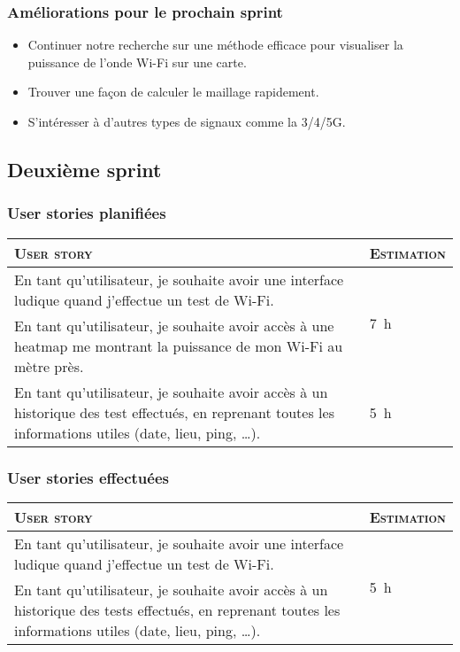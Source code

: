 \documentclass{elsarticle}
\newcommand{\est}[1]{\multirow{2}{*}{\SI{#1}{\hour}}}
\begin{document}
\subsubsection{Améliorations pour le prochain sprint}
\begin{itemize}
	\item Continuer notre recherche sur une méthode efficace pour visualiser la puissance de l’onde Wi-Fi sur une carte.
	\item Trouver une façon de calculer le maillage rapidement.
	\item S’intéresser à d’autres types de signaux comme la 3/4/5G.
\end{itemize}

\subsection{Deuxième sprint}
\subsubsection{User stories planifiées}
\begin{table}[H]
	\centering
	\begin{tabular}{p{14cm}m{2cm}}
		\toprule
		\textsc{User story} & \textsc{Estimation}\\
		\midrule
		En tant qu'utilisateur, je souhaite avoir une interface ludique quand j'effectue un test de Wi-Fi. & \est{7}\\
		\midrule
		En tant qu'utilisateur, je souhaite avoir accès à une heatmap me montrant la puissance de mon Wi-Fi au mètre près. & \est{30}\\
		\midrule
		En tant qu'utilisateur, je souhaite avoir accès à un historique des test effectués, en reprenant toutes les informations utiles (date, lieu, ping, \ldots). & \est{5}\\
		\bottomrule
	\end{tabular}
\end{table}

\subsubsection{User stories effectuées}
\begin{table}[H]
	\centering
	\begin{tabular}{p{14cm}m{2cm}}
		\toprule
		\textsc{User story} & \textsc{Estimation}\\
		\midrule
		En tant qu'utilisateur, je souhaite avoir une interface ludique quand j'effectue un test de Wi-Fi. & \est{5}\\
		\midrule
		En tant qu'utilisateur, je souhaite avoir accès à un historique des tests effectués, en reprenant toutes les informations utiles (date, lieu, ping, \ldots). & \est{7}\\
		\bottomrule
	\end{tabular}
\end{table}
\end{document}
